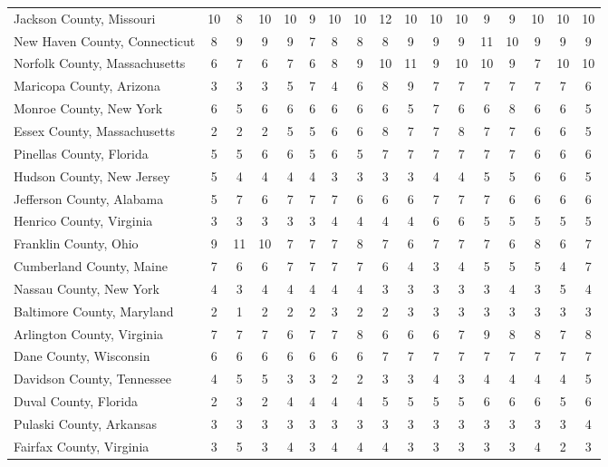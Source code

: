 \begin{landscape}
\begin{longtable}{lcccccccccccccccc}
	Jackson County, Missouri & 10 & 8 & 10 & 10 & 9 & 10 & 10 & 12 & 10 & 10 & 10 & 9 & 9 & 10 & 10 & 10 \\
	New Haven County, Connecticut & 8 & 9 & 9 & 9 & 7 & 8 & 8 & 8 & 9 & 9 & 9 & 11 & 10 & 9 & 9 & 9 \\
	Norfolk County, Massachusetts & 6 & 7 & 6 & 7 & 6 & 8 & 9 & 10 & 11 & 9 & 10 & 10 & 9 & 7 & 10 & 10 \\
	Maricopa County, Arizona & 3 & 3 & 3 & 5 & 7 & 4 & 6 & 8 & 9 & 7 & 7 & 7 & 7 & 7 & 7 & 6 \\
	Monroe County, New York & 6 & 5 & 6 & 6 & 6 & 6 & 6 & 6 & 5 & 7 & 6 & 6 & 8 & 6 & 6 & 5 \\
	Essex County, Massachusetts & 2 & 2 & 2 & 5 & 5 & 6 & 6 & 8 & 7 & 7 & 8 & 7 & 7 & 6 & 6 & 5 \\
	Pinellas County, Florida & 5 & 5 & 6 & 6 & 5 & 6 & 5 & 7 & 7 & 7 & 7 & 7 & 7 & 6 & 6 & 6 \\
	Hudson County, New Jersey & 5 & 4 & 4 & 4 & 4 & 3 & 3 & 3 & 3 & 4 & 4 & 5 & 5 & 6 & 6 & 5 \\
	Jefferson County, Alabama & 5 & 7 & 6 & 7 & 7 & 7 & 6 & 6 & 6 & 7 & 7 & 7 & 6 & 6 & 6 & 6 \\
	Henrico County, Virginia & 3 & 3 & 3 & 3 & 3 & 4 & 4 & 4 & 4 & 6 & 6 & 5 & 5 & 5 & 5 & 5 \\
	Franklin County, Ohio & 9 & 11 & 10 & 7 & 7 & 7 & 8 & 7 & 6 & 7 & 7 & 7 & 6 & 8 & 6 & 7 \\
	Cumberland County, Maine & 7 & 6 & 6 & 7 & 7 & 7 & 7 & 6 & 4 & 3 & 4 & 5 & 5 & 5 & 4 & 7 \\
	Nassau County, New York & 4 & 3 & 4 & 4 & 4 & 4 & 4 & 3 & 3 & 3 & 3 & 3 & 4 & 3 & 5 & 4 \\
	Baltimore County, Maryland & 2 & 1 & 2 & 2 & 2 & 3 & 2 & 2 & 3 & 3 & 3 & 3 & 3 & 3 & 3 & 3 \\
	Arlington County, Virginia & 7 & 7 & 7 & 6 & 7 & 7 & 8 & 6 & 6 & 6 & 7 & 9 & 8 & 8 & 7 & 8 \\
	Dane County, Wisconsin & 6 & 6 & 6 & 6 & 6 & 6 & 6 & 7 & 7 & 7 & 7 & 7 & 7 & 7 & 7 & 7 \\
	Davidson County, Tennessee & 4 & 5 & 5 & 3 & 3 & 2 & 2 & 3 & 3 & 4 & 3 & 4 & 4 & 4 & 4 & 5 \\
	Duval County, Florida & 2 & 3 & 2 & 4 & 4 & 4 & 4 & 5 & 5 & 5 & 5 & 6 & 6 & 6 & 5 & 6 \\
	Pulaski County, Arkansas & 3 & 3 & 3 & 3 & 3 & 3 & 3 & 3 & 3 & 3 & 3 & 3 & 3 & 3 & 3 & 4 \\
	Fairfax County, Virginia & 3 & 5 & 3 & 4 & 3 & 4 & 4 & 4 & 3 & 3 & 3 & 3 & 3 & 4 & 2 & 3 \\

\end{longtable}
\end{landscape}
